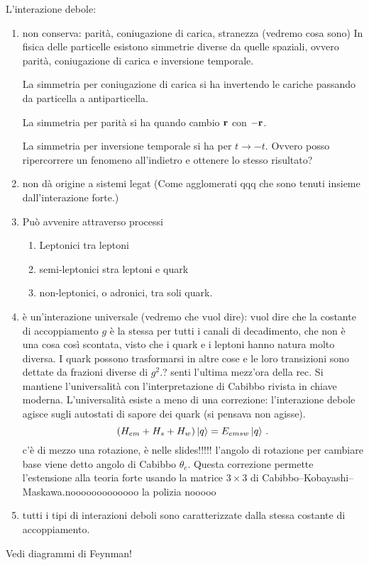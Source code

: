         L'interazione debole: 
        \begin{enumerate}
            \item non conserva: parità, coniugazione di carica, stranezza (vedremo cosa sono)
            In fisica delle particelle esistono simmetrie diverse da quelle spaziali, ovvero parità, coniugazione di carica e inversione temporale.

            La simmetria per coniugazione di carica si ha invertendo le cariche passando da particella a antiparticella.

            La simmetria per parità si ha quando cambio $\vb{r}$ con $-\vb{r}$.

            La simmetria per inversione temporale si ha per $t\rightarrow-t$. Ovvero posso ripercorrere un fenomeno all'indietro e ottenere lo stesso risultato?
            \item non dà origine a sistemi legat (Come agglomerati qqq che sono tenuti insieme dall'interazione forte.)
            \item Può avvenire attraverso processi
            \begin{enumerate}
                \item Leptonici tra leptoni
                \item semi-leptonici stra leptoni e quark
                \item non-leptonici, o adronici, tra soli quark.
            \end{enumerate}
            \item è un'interazione universale (vedremo che vuol dire): vuol dire che la costante di accoppiamento $g$ è la stessa per tutti i canali di decadimento, che non è una cosa così scontata, visto che i quark e i leptoni hanno natura molto diversa. I quark possono trasformarsi in altre cose e le loro transizioni sono dettate da frazioni diverse di $g^2$.? senti l'ultima mezz'ora della rec. Si mantiene l'universalità con l'interpretazione di Cabibbo rivista in chiave moderna. L'universalità esiste a meno di una correzione: l'interazione debole agisce sugli autostati di sapore dei quark (si pensava non agisse).
            \begin{equation*}
                \pqty{H_{em} + H_{s} + H_w} \ket{q} = E_{emsw}\ket{q}\,.
            \end{equation*}
            c'è di mezzo una rotazione, è nelle slides!!!!! l'angolo di rotazione per cambiare base viene detto angolo di Cabibbo $\theta_c$. Questa correzione permette l'estensione alla teoria forte usando la matrice $3\times3$ di Cabibbo--Kobayashi--Maskawa.nooooooooooooo la polizia nooooo
            \item tutti i tipi di interazioni deboli sono caratterizzate dalla stessa costante di accoppiamento.
        \end{enumerate}
        Vedi diagrammi di Feynman!
        
